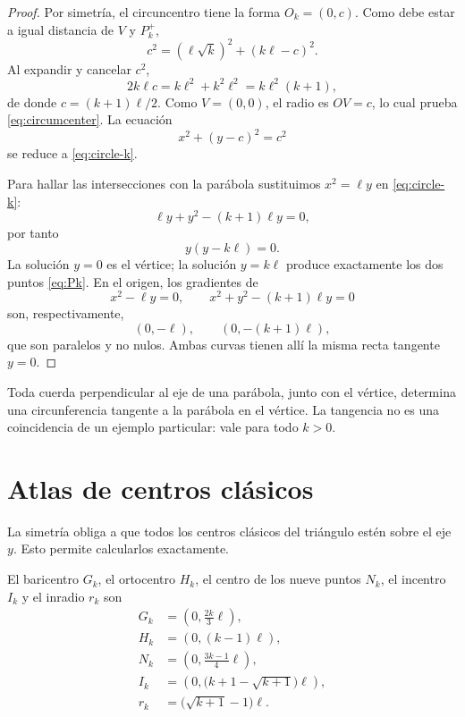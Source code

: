 \documentclass[11pt,a4paper,openany]{report}
\begin{document}
\begin{proof}
Por simetría, el circuncentro tiene la forma \(O_k=(0,c)\). Como debe estar a igual distancia de \(V\) y \(P_k^+\),
\[
 c^2=(\ell\sqrt{k})^2+(k\ell-c)^2.
\]
Al expandir y cancelar \(c^2\),
\[
 2k\ell c=k\ell^2+k^2\ell^2=k\ell^2(k+1),
\]
de donde \(c=(k+1)\ell/2\). Como \(V=(0,0)\), el radio es \(OV=c\), lo cual prueba \eqref{eq:circumcenter}. La ecuación
\[
 x^2+(y-c)^2=c^2
\]
se reduce a \eqref{eq:circle-k}.

Para hallar las intersecciones con la parábola sustituimos \(x^2=\ell y\) en \eqref{eq:circle-k}:
\[
 \ell y+y^2-(k+1)\ell y=0,
\]
por tanto
\[
 y(y-k\ell)=0.
\]
La solución \(y=0\) es el vértice; la solución \(y=k\ell\) produce exactamente los dos puntos \eqref{eq:Pk}. En el origen, los gradientes de
\[
 x^2-\ell y=0,
 \qquad
 x^2+y^2-(k+1)\ell y=0
\]
son, respectivamente,
\[
 (0,-\ell),\qquad (0,-(k+1)\ell),
\]
que son paralelos y no nulos. Ambas curvas tienen allí la misma recta tangente \(y=0\).
\end{proof}

\begin{rigorousbox}
Toda cuerda perpendicular al eje de una parábola, junto con el vértice, determina una circunferencia tangente a la parábola en el vértice. La tangencia no es una coincidencia de un ejemplo particular: vale para todo \(k>0\).
\end{rigorousbox}

\section{Atlas de centros clásicos}

La simetría obliga a que todos los centros clásicos del triángulo estén sobre el eje \(y\). Esto permite calcularlos exactamente.

\begin{proposition}[Centros de \(T_k\)]
El baricentro \(G_k\), el ortocentro \(H_k\), el centro de los nueve puntos \(N_k\), el incentro \(I_k\) y el inradio \(r_k\) son
\begin{align}
 G_k&=\left(0,\frac{2k}{3}\ell\right),\label{eq:G}\\
 H_k&=(0,(k-1)\ell),\label{eq:H}\\
 N_k&=\left(0,\frac{3k-1}{4}\ell\right),\label{eq:N}\\
 I_k&=\left(0,\bigl(k+1-\sqrt{k+1}\bigr)\ell\right),\label{eq:I}\\
 r_k&=\bigl(\sqrt{k+1}-1\bigr)\ell.\label{eq:inradius}
\end{align}
\end{proposition}
\end{document}
